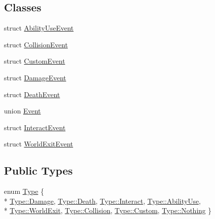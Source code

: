 \subsection*{Classes}
\begin{DoxyCompactItemize}
\item 
struct \hyperlink{structZeta_1_1WorldEvent_1_1AbilityUseEvent}{Ability\+Use\+Event}
\item 
struct \hyperlink{structZeta_1_1WorldEvent_1_1CollisionEvent}{Collision\+Event}
\item 
struct \hyperlink{structZeta_1_1WorldEvent_1_1CustomEvent}{Custom\+Event}
\item 
struct \hyperlink{structZeta_1_1WorldEvent_1_1DamageEvent}{Damage\+Event}
\item 
struct \hyperlink{structZeta_1_1WorldEvent_1_1DeathEvent}{Death\+Event}
\item 
union \hyperlink{unionZeta_1_1WorldEvent_1_1Event}{Event}
\item 
struct \hyperlink{structZeta_1_1WorldEvent_1_1InteractEvent}{Interact\+Event}
\item 
struct \hyperlink{structZeta_1_1WorldEvent_1_1WorldExitEvent}{World\+Exit\+Event}
\end{DoxyCompactItemize}
\subsection*{Public Types}
\begin{DoxyCompactItemize}
\item 
enum \hyperlink{classZeta_1_1WorldEvent_a92adb82c22c6f59afec5911098f85158}{Type} \{ \\*
\hyperlink{classZeta_1_1WorldEvent_a92adb82c22c6f59afec5911098f85158ab9f24e83531326204197015b2f43a93f}{Type\+::\+Damage}, 
\hyperlink{classZeta_1_1WorldEvent_a92adb82c22c6f59afec5911098f85158a6097f89e3092d4ccd249c9d479785c1f}{Type\+::\+Death}, 
\hyperlink{classZeta_1_1WorldEvent_a92adb82c22c6f59afec5911098f85158aefbc873e4634f3db63d62377d36e5f56}{Type\+::\+Interact}, 
\hyperlink{classZeta_1_1WorldEvent_a92adb82c22c6f59afec5911098f85158a5dadddcab7b632bf2e8a293c2ec38b9f}{Type\+::\+Ability\+Use}, 
\\*
\hyperlink{classZeta_1_1WorldEvent_a92adb82c22c6f59afec5911098f85158a57d7a10e34033a07b2b9dc1f89632ffa}{Type\+::\+World\+Exit}, 
\hyperlink{classZeta_1_1WorldEvent_a92adb82c22c6f59afec5911098f85158a15fb6ccbd11ebebcea2b48dc477f3561}{Type\+::\+Collision}, 
\hyperlink{classZeta_1_1WorldEvent_a92adb82c22c6f59afec5911098f85158a90589c47f06eb971d548591f23c285af}{Type\+::\+Custom}, 
\hyperlink{classZeta_1_1WorldEvent_a92adb82c22c6f59afec5911098f85158af80a4ad87fee7c9fdc19b7769495fdb5}{Type\+::\+Nothing}
 \}
\end{DoxyCompactItemize}
